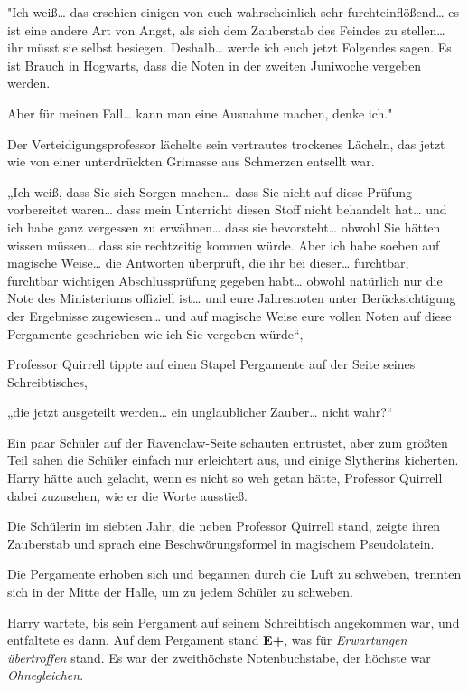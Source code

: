 {"Ich weiß… das erschien einigen von euch wahrscheinlich sehr furchteinflößend… es ist eine andere Art von Angst, als sich dem Zauberstab des Feindes zu stellen… ihr müsst sie selbst besiegen. Deshalb… werde ich euch jetzt Folgendes sagen. Es ist Brauch in Hogwarts, dass die Noten in der zweiten Juniwoche vergeben werden.

Aber für meinen Fall… kann man eine Ausnahme machen, denke ich."

Der Verteidigungsprofessor lächelte sein vertrautes trockenes Lächeln, das jetzt wie von einer unterdrückten Grimasse aus Schmerzen entsellt war.

„Ich weiß, dass Sie sich Sorgen machen… dass Sie nicht auf diese Prüfung vorbereitet waren… dass mein Unterricht diesen Stoff nicht behandelt hat… und ich habe ganz vergessen zu erwähnen… dass sie bevorsteht… obwohl Sie hätten wissen müssen… dass sie rechtzeitig kommen würde. Aber ich habe soeben auf magische Weise… die Antworten überprüft, die ihr bei dieser… furchtbar, furchtbar wichtigen Abschlussprüfung gegeben habt… obwohl natürlich nur die Note des Ministeriums offiziell ist… und eure Jahresnoten unter Berücksichtigung der Ergebnisse zugewiesen… und auf magische Weise eure vollen Noten auf diese Pergamente geschrieben wie ich Sie vergeben würde“,

Professor Quirrell tippte auf einen Stapel Pergamente auf der Seite seines Schreibtisches,

„die jetzt ausgeteilt werden… ein unglaublicher Zauber… nicht wahr?“

Ein paar Schüler auf der Ravenclaw-Seite schauten entrüstet, aber zum größten Teil sahen die Schüler einfach nur erleichtert aus, und einige Slytherins kicherten. Harry hätte auch gelacht, wenn es nicht so weh getan hätte, Professor Quirrell dabei zuzusehen, wie er die Worte ausstieß.

Die Schülerin im siebten Jahr, die neben Professor Quirrell stand, zeigte ihren Zauberstab und sprach eine Beschwörungsformel in magischem Pseudolatein.

Die Pergamente erhoben sich und begannen durch die Luft zu schweben, trennten sich in der Mitte der Halle, um zu jedem Schüler zu schweben.

Harry wartete, bis sein Pergament auf seinem Schreibtisch angekommen war, und entfaltete es dann. Auf dem Pergament stand \textbf{E+}, was für \emph{Erwartungen übertroffen} stand. Es war der zweithöchste Notenbuchstabe, der höchste war \emph{Ohnegleichen}.

}

